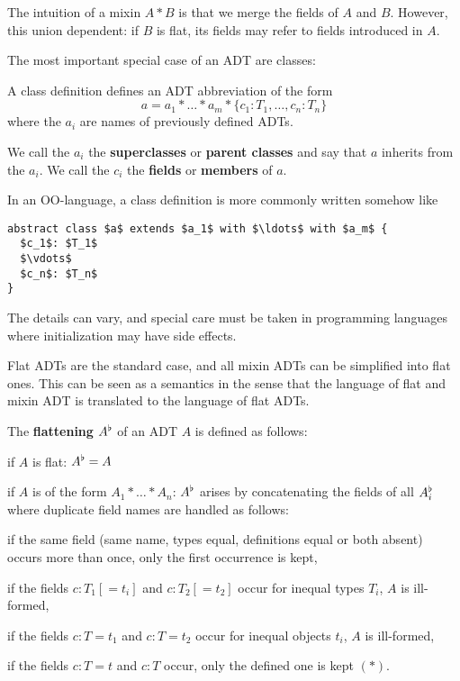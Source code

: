 The intuition of a mixin $A*B$ is that we merge the fields of $A$ and $B$.
However, this union dependent: if $B$ is flat, its fields may refer to fields introduced in $A$.

The most important special case of an ADT are classes:

\begin{definition}[Class]
A class definition defines an ADT abbreviation of the form
\[a = a_1*\ldots*a_m*\{c_1:T_1,\ldots,c_n:T_n\}\]
where the $a_i$ are names of previously defined ADTs.

We call the $a_i$ the \textbf{superclasses} or \textbf{parent classes} and say that $a$ inherits from the $a_i$.
We call the $c_i$ the \textbf{fields} or \textbf{members} of $a$.
\end{definition}

In an OO-language, a class definition is more commonly written somehow like
\begin{lstlisting}
abstract class $a$ extends $a_1$ with $\ldots$ with $a_m$ {
  $c_1$: $T_1$
  $\vdots$
  $c_n$: $T_n$
}
\end{lstlisting}
The details can vary, and special care must be taken in programming languages where initialization may have side effects.

Flat ADTs are the standard case, and all mixin ADTs can be simplified into flat ones.
This can be seen as a semantics in the sense that the language of flat and mixin ADT is translated to the language of flat ADTs.
\begin{definition}\label{def:mixinflat}
The \textbf{flattening} $A^\flat$ of an ADT $A$ is defined as follows:
\begin{compactitem}
 \item if $A$ is flat: $A^\flat=A$
 \item if $A$ is of the form $A_1*\ldots*A_n$:
 $A^\flat$ arises by concatenating the fields of all $A_i^\flat$ where duplicate field names are handled as follows:
  \begin{compactitem}
   \item if the same field (same name, types equal, definitions equal or both absent) occurs more than once, only the first occurrence is kept,
   \item if the fields $c:T_1[=t_i]$ and $c:T_2[=t_2]$ occur for inequal types $T_i$, $A$ is ill-formed,
   \item if the fields $c:T=t_1$ and $c:T=t_2$ occur for inequal objects $t_i$, $A$ is ill-formed,
   \item if the fields $c:T=t$ and $c:T$ occur, only the defined one is kept $(\ast)$.
  \end{compactitem}
\end{compactitem}
\end{definition}

